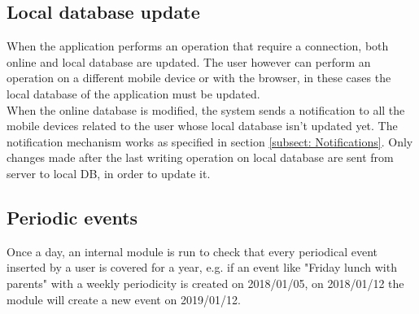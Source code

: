 \subsection{Local database update}
\label{subsect:Local database update}
When the application performs an operation that require a connection, both online and local database are updated. The user however can perform an operation on a different mobile device or with the browser, in these cases the local database of the application must be updated.\\
When the online database is modified, the system sends a notification to all the mobile devices related to the user whose local database isn't updated yet. The notification mechanism works as specified in section \ref{subsect: Notifications}. Only changes made after the last writing operation on local database are sent from server to local DB, in order to update it.

\subsection{Periodic events}
\label{subsect:Periodic events}
Once a day, an internal module is run to check that every periodical event inserted by a user is covered for a year, e.g. if an event like "Friday lunch with parents" with a weekly periodicity is created on 2018/01/05, on 2018/01/12 the module will create a new event on 2019/01/12.
